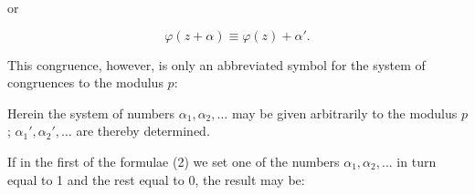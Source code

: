 or

\[
\varphi(z+\alpha) \equiv \varphi(z) + \alpha'.
\]

This congruence, however, is only an abbreviated symbol for the system of congruences to the modulus $p$:


Herein the system of numbers $\alpha_1, \alpha_2, \dots$ may be given arbitrarily to the modulus $p$; $\alpha_1', \alpha_2', \dots$ are thereby determined.

If in the first of the formulae (2) we set one of the numbers $\alpha_1, \alpha_2, \dots$ in turn equal to 1 and the rest equal to 0, the result may be:

